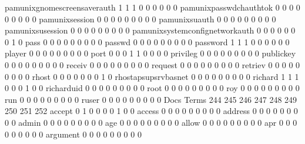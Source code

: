 \documentclass[compress,8pt]{beamer}
\begin{document}
\begin{frame}
\begin{Schunk}
  pamunixgnomescreensaverauth                1   1   1   0   0   0   0   0   0
  pamunixpasswdchauthtok                     0   0   0   0   0   0   0   0   0
  pamunixsession                             0   0   0   0   0   0   0   0   0
  pamunixsuauth                              0   0   0   0   0   0   0   0   0
  pamunixsusession                           0   0   0   0   0   0   0   0   0
  pamunixsystemconfignetworkauth             0   0   0   0   0   0   0   1   0
  pass                                       0   0   0   0   0   0   0   0   0
  passwd                                     0   0   0   0   0   0   0   0   0
  password                                   1   1   1   0   0   0   0   0   0
  player                                     0   0   0   0   0   0   0   0   0
  port                                       0   0   0   1   1   0   0   0   0
  privileg                                   0   0   0   0   0   0   0   0   0
  publickey                                  0   0   0   0   0   0   0   0   0
  receiv                                     0   0   0   0   0   0   0   0   0
  request                                    0   0   0   0   0   0   0   0   0
  retriev                                    0   0   0   0   0   0   0   0   0
  rhost                                      0   0   0   0   0   0   0   1   0
  rhostapsupsrvbasnet                        0   0   0   0   0   0   0   0   0
  richard                                    1   1   1   0   0   0   1   0   0
  richarduid                                 0   0   0   0   0   0   0   0   0
  root                                       0   0   0   0   0   0   0   0   0
  roy                                        0   0   0   0   0   0   0   0   0
  run                                        0   0   0   0   0   0   0   0   0
  ruser                                      0   0   0   0   0   0   0   0   0
                                          Docs
Terms                                      244 245 246 247 248 249 250 251 252
  accept                                     0   1   0   0   0   0   1   0   0
  access                                     0   0   0   0   0   0   0   0   0
  address                                    0   0   0   0   0   0   0   0   0
  admin                                      0   0   0   0   0   0   0   0   0
  age                                        0   0   0   0   0   0   0   0   0
  allow                                      0   0   0   0   0   0   0   0   0
  apr                                        0   0   0   0   0   0   0   0   0
  argument                                   0   0   0   0   0   0   0   0   0

\end{Schunk}
\end{frame}
\end{document}
